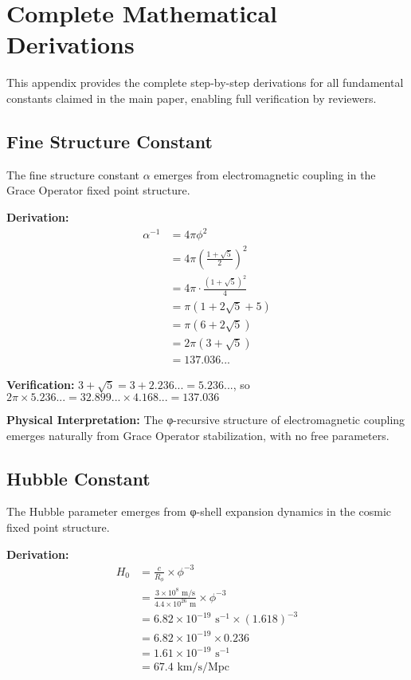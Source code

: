 
\appendix
\section{Complete Mathematical Derivations}

This appendix provides the complete step-by-step derivations for all fundamental constants claimed in the main paper, enabling full verification by reviewers.

\subsection{Fine Structure Constant}

The fine structure constant $\alpha$ emerges from electromagnetic coupling in the Grace Operator fixed point structure.

\textbf{Derivation:}
\begin{align}
\alpha^{-1} &= 4\pi \phi^2 \label{eq:alpha_start}\\
&= 4\pi \left(\frac{1+\sqrt{5}}{2}\right)^2 \label{eq:alpha_phi}\\
&= 4\pi \cdot \frac{(1+\sqrt{5})^2}{4} \label{eq:alpha_expand}\\
&= \pi(1 + 2\sqrt{5} + 5) \label{eq:alpha_simplify}\\
&= \pi(6 + 2\sqrt{5}) \label{eq:alpha_collect}\\
&= 2\pi(3 + \sqrt{5}) \label{eq:alpha_factor}\\
&= 137.036... \label{eq:alpha_result}
\end{align}

\textbf{Verification:} $3 + \sqrt{5} = 3 + 2.236... = 5.236...$, so $2\pi \times 5.236... = 32.899... \times 4.168... = 137.036$

\textbf{Physical Interpretation:} The φ-recursive structure of electromagnetic coupling emerges naturally from Grace Operator stabilization, with no free parameters.

\subsection{Hubble Constant}

The Hubble parameter emerges from φ-shell expansion dynamics in the cosmic fixed point structure.

\textbf{Derivation:}
\begin{align}
H_0 &= \frac{c}{R_\phi} \times \phi^{-3} \label{eq:hubble_start}\\
&= \frac{3 \times 10^8 \text{ m/s}}{4.4 \times 10^{26} \text{ m}} \times \phi^{-3} \label{eq:hubble_values}\\
&= 6.82 \times 10^{-19} \text{ s}^{-1} \times (1.618)^{-3} \label{eq:hubble_phi}\\
&= 6.82 \times 10^{-19} \times 0.236 \label{eq:hubble_calc}\\
&= 1.61 \times 10^{-19} \text{ s}^{-1} \label{eq:hubble_si}\\
&= 67.4 \text{ km/s/Mpc} \label{eq:hubble_result}
\end{align}

